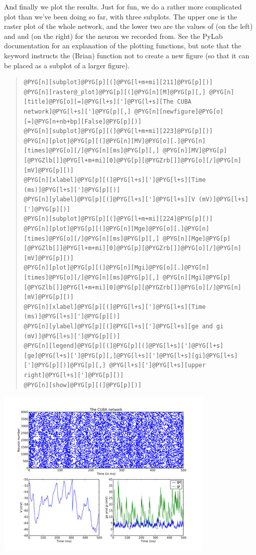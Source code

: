 \documentclass[letterpaper,10pt,english]{manual}
\begin{document}
And finally we plot the results. Just for fun, we do a rather more
complicated plot than we've been doing so far, with three subplots.
The upper one is the raster plot of the whole network, and the
lower two are the values of  (on the left) and  and  (on the
right) for the neuron we recorded from. See the PyLab documentation
for an explanation of the plotting functions, but note that the
\hyperlink{brian.raster_plot}{} keyword  instructs the (Brian) function
\hyperlink{brian.raster_plot}{} not to create a new figure (so that it can be placed
as a subplot of a larger figure).
\begin{quote}

\begin{Verbatim}[commandchars=@\[\]]
@PYG[n][subplot]@PYG[p][(]@PYG[l+m+mi][211]@PYG[p][)]
@PYG[n][raster@_plot]@PYG[p][(]@PYG[n][M]@PYG[p][,] @PYG[n][title]@PYG[o][=]@PYG[l+s][']@PYG[l+s][The CUBA network]@PYG[l+s][']@PYG[p][,] @PYG[n][newfigure]@PYG[o][=]@PYG[n+nb+bp][False]@PYG[p][)]
@PYG[n][subplot]@PYG[p][(]@PYG[l+m+mi][223]@PYG[p][)]
@PYG[n][plot]@PYG[p][(]@PYG[n][MV]@PYG[o][.]@PYG[n][times]@PYG[o][/]@PYG[n][ms]@PYG[p][,] @PYG[n][MV]@PYG[p][@PYGZlb[]]@PYG[l+m+mi][0]@PYG[p][@PYGZrb[]]@PYG[o][/]@PYG[n][mV]@PYG[p][)]
@PYG[n][xlabel]@PYG[p][(]@PYG[l+s][']@PYG[l+s][Time (ms)]@PYG[l+s][']@PYG[p][)]
@PYG[n][ylabel]@PYG[p][(]@PYG[l+s][']@PYG[l+s][V (mV)]@PYG[l+s][']@PYG[p][)]
@PYG[n][subplot]@PYG[p][(]@PYG[l+m+mi][224]@PYG[p][)]
@PYG[n][plot]@PYG[p][(]@PYG[n][Mge]@PYG[o][.]@PYG[n][times]@PYG[o][/]@PYG[n][ms]@PYG[p][,] @PYG[n][Mge]@PYG[p][@PYGZlb[]]@PYG[l+m+mi][0]@PYG[p][@PYGZrb[]]@PYG[o][/]@PYG[n][mV]@PYG[p][)]
@PYG[n][plot]@PYG[p][(]@PYG[n][Mgi]@PYG[o][.]@PYG[n][times]@PYG[o][/]@PYG[n][ms]@PYG[p][,] @PYG[n][Mgi]@PYG[p][@PYGZlb[]]@PYG[l+m+mi][0]@PYG[p][@PYGZrb[]]@PYG[o][/]@PYG[n][mV]@PYG[p][)]
@PYG[n][xlabel]@PYG[p][(]@PYG[l+s][']@PYG[l+s][Time (ms)]@PYG[l+s][']@PYG[p][)]
@PYG[n][ylabel]@PYG[p][(]@PYG[l+s][']@PYG[l+s][ge and gi (mV)]@PYG[l+s][']@PYG[p][)]
@PYG[n][legend]@PYG[p][(]@PYG[p][(]@PYG[l+s][']@PYG[l+s][ge]@PYG[l+s][']@PYG[p][,]@PYG[l+s][']@PYG[l+s][gi]@PYG[l+s][']@PYG[p][)]@PYG[p][,] @PYG[l+s][']@PYG[l+s][upper right]@PYG[l+s][']@PYG[p][)]
@PYG[n][show]@PYG[p][(]@PYG[p][)]
\end{Verbatim}
\end{quote}

\includegraphics{2c.jpg}
\end{document}
